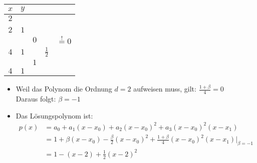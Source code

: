 \begin{minipage}[c]{6cm}
	\renewcommand{\arraystretch}{1.0}
	\begin{tabular}{|c|llll|}
		\hline
		$x$	&\multicolumn{4}{l|}{$y$}\\
		\hline
		$2$	&\kreisS{$1$}{$a_0$}&	&&\\
			&	&\kreisS{$\beta$}{$a_1$}&&\\
		$2$	&$1$&	&\kreisB{$-\frac \beta2$}{$a_2$}&\\
			&	&$0$&				  &\kreisB{$\frac{1+\beta}{4}$}{$a_3$}$\overset{!}{=}0$\\
		$4$	&$1$&	&$\frac 12$&\\
			&	&$1$&&\\
		$4$	&$1$&	&&\\		
		\hline
	\end{tabular}
	\renewcommand{\arraystretch}{1.5}
\end{minipage}
\hfill
\begin{minipage}[c]{12cm}

	\vspace{0.5cm}
	
	\begin{itemize}
		\item Weil das Polynom die Ordnung $d=2$ aufweisen muss, gilt: $\frac{1+\beta}4=0$\\
		Daraus folgt: $\beta=-1$
		\item Das Lösungspolynom ist:
		\begin{align} p(x)&=a_0+a_1(x-x_0)+a_2(x-x_0)^2+a_3(x-x_0)^2(x-x_1)\nonumber\\
		&=1+\beta(x-x_0)-\frac \beta2(x-x_0)^2+\frac{1+\beta}4(x-x_0)^2(x-x_1)\big|_{\beta=-1}\nonumber\\
		&=1-(x-2)+\frac 12(x-2)^2\nonumber
		\end{align}
	\end{itemize}
\end{minipage}

\vfill
